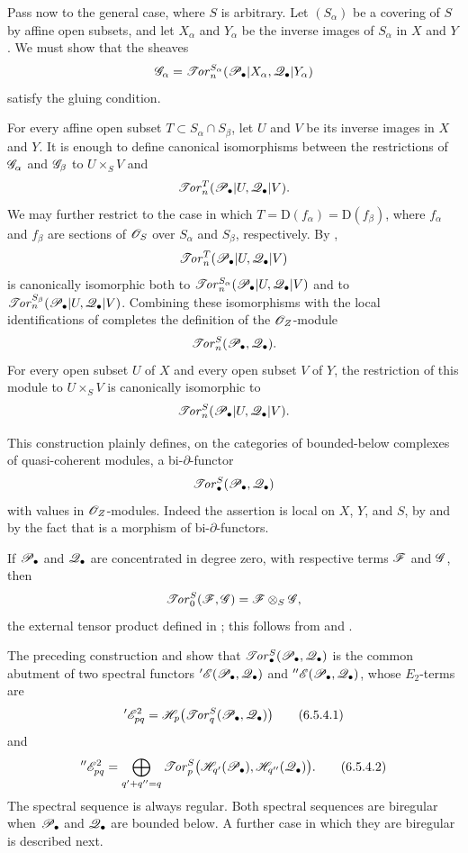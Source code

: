 \begin{env}[6.5.3]
\label{III.6.5.3}
Pass now to the general case, where $S$ is arbitrary.  Let
$(S_\alpha)$ be a covering of $S$ by affine open subsets, and let
$X_\alpha$ and $Y_\alpha$ be the inverse images of $S_\alpha$ in
$X$ and $Y$.  We must show that the sheaves
\[
  \mathscr{G}_\alpha
  =
  \mathscr{T}\!\mathit{or}_n^{S_\alpha}
  (\mathscr{P}_\bullet|X_\alpha,\mathscr{Q}_\bullet|Y_\alpha)
\]
satisfy the gluing condition.

For every affine open subset
$T\subset S_\alpha\cap S_\beta$, let $U$ and $V$ be its inverse
images in $X$ and $Y$.  It is enough to define canonical
isomorphisms between the restrictions of $\mathscr{G}_\alpha$ and
$\mathscr{G}_\beta$ to $U\times_SV$ and
\[
  \mathscr{T}\!\mathit{or}_n^T(\mathscr{P}_\bullet|U,\mathscr{Q}_\bullet|V).
\]
We may further restrict to the case in which
$T=\mathrm D(f_\alpha)=\mathrm D(f_\beta)$, where $f_\alpha$ and
$f_\beta$ are sections of $\mathscr{O}_S$ over $S_\alpha$ and
$S_\beta$, respectively.  By ,
\[
  \mathscr{T}\!\mathit{or}_n^T(\mathscr{P}_\bullet|U,\mathscr{Q}_\bullet|V)
\]
is canonically isomorphic both to
$\mathscr{T}\!\mathit{or}_n^{S_\alpha}(\mathscr{P}_\bullet|U,\mathscr{Q}_\bullet|V)$ and to
$\mathscr{T}\!\mathit{or}_n^{S_\beta}(\mathscr{P}_\bullet|U,\mathscr{Q}_\bullet|V)$.
Combining these isomorphisms with the local identifications of
 completes the definition of the
$\mathscr{O}_Z$-module
\[
  \mathscr{T}\!\mathit{or}_n^S(\mathscr{P}_\bullet,\mathscr{Q}_\bullet).
\]
For every open subset $U$ of $X$ and every open subset $V$ of
$Y$, the restriction of this module to $U\times_SV$ is
canonically isomorphic to
\[
  \mathscr{T}\!\mathit{or}_n^S(\mathscr{P}_\bullet|U,\mathscr{Q}_\bullet|V).
\]

This construction plainly defines, on the categories of
bounded-below complexes of quasi-coherent modules, a
bi-$\partial$-functor
\[
  \mathscr{T}\!\mathit{or}_\bullet^S(\mathscr{P}_\bullet,\mathscr{Q}_\bullet)
\]
with values in $\mathscr{O}_Z$-modules.  Indeed the assertion is local
on $X$, $Y$, and $S$, by  and by the fact that
 is a morphism of bi-$\partial$-functors.

If $\mathscr{P}_\bullet$ and $\mathscr{Q}_\bullet$ are concentrated in degree
zero, with respective terms $\mathscr{F}$ and $\mathscr{G}$, then
\[
  \mathscr{T}\!\mathit{or}_0^S(\mathscr{F},\mathscr{G})
  =
  \mathscr{F}\otimes_S\mathscr{G},
\]
the external tensor product defined in ; this
follows from  and .
\end{env}

\begin{env}[6.5.4]
\label{III.6.5.4}
The preceding construction and  show that
$\mathscr{T}\!\mathit{or}_\bullet^S(\mathscr{P}_\bullet,\mathscr{Q}_\bullet)$ is the common abutment
of two spectral functors
$'\mathscr{E}(\mathscr{P}_\bullet,\mathscr{Q}_\bullet)$ and
$''\mathscr{E}(\mathscr{P}_\bullet,\mathscr{Q}_\bullet)$, whose $E_2$-terms are
\[
  '\mathscr{E}_{pq}^2
  =
  \mathscr{H}_p\bigl(\mathscr{T}\!\mathit{or}_q^S(\mathscr{P}_\bullet,\mathscr{Q}_\bullet)\bigr)
  \tag{6.5.4.1}\label{III.6.5.4.1}
\]
and
\[
  ''\mathscr{E}_{pq}^2
  =
  \bigoplus_{q'+q''=q}
  \mathscr{T}\!\mathit{or}_p^S
  \bigl(\mathscr{H}_{q'}(\mathscr{P}_\bullet),
        \mathscr{H}_{q''}(\mathscr{Q}_\bullet)\bigr).
  \tag{6.5.4.2}\label{III.6.5.4.2}
\]
The spectral sequence  is always regular.  Both
spectral sequences are biregular when $\mathscr{P}_\bullet$ and
$\mathscr{Q}_\bullet$ are bounded below.  A further case in which they
are biregular is described next.
\end{env}

